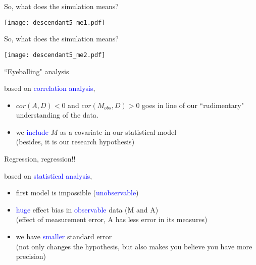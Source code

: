 %
%
\begin{frame}
	{So, what does the simulation means?}
	
	\begin{figure*}
		\texttt{[image: descendant5\_me1.pdf]}
	\end{figure*}
\end{frame}
%
%
\begin{frame}
	{So, what does the simulation means?}
	
	\begin{figure*}
		\texttt{[image: descendant5\_me2.pdf]}
	\end{figure*}
\end{frame}
%
%
\begin{lhframe}[rhgraphic={\texttt{[image: descendant5\_panel.pdf]}}]
	{``Eyeballing" analysis}
	
	based on \textcolor{blue}{correlation analysis},
	\begin{itemize}
		\item $cor(A, D)<0$ and $cor(M_{obs}, D)>0$
		goes in line of our ``rudimentary" understanding of the data.
		\item we \textcolor{blue}{include} $M$ as a covariate in our statistical model \\
		{\small (besides, it is our research hypothesis)}
	\end{itemize}
\end{lhframe}
%
%
\begin{lhframe}[rhgraphic={\texttt{[image: descendant5\_reg.png]}}]
	{Regression, regression!!}
	
	based on \textcolor{blue}{statistical analysis},
	\begin{itemize}
		\item first model is impossible (\textcolor{blue}{unobservable})
		\item \textcolor{blue}{huge} effect bias in \textcolor{blue}{observable} data (M  and A) \\
		{\small (effect of measurement error, A has less error in its measures)}
		\item we have \textcolor{blue}{smaller} standard error \\
		{\small (not only changes the hypothesis, but also makes you believe you have more precision)}
	\end{itemize}
\end{lhframe}
%
%

